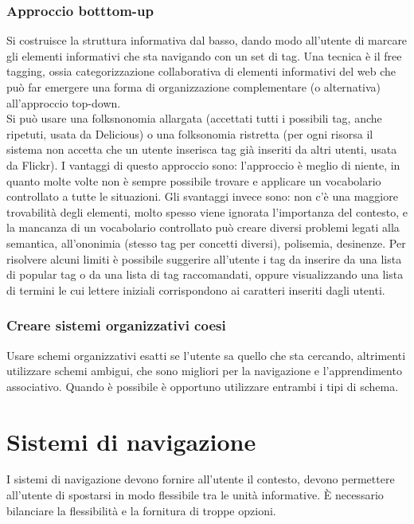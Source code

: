 \documentclass{article}
\begin{document}
\subsubsection{Approccio botttom-up}
Si costruisce la struttura informativa dal basso, dando modo all'utente di marcare gli elementi informativi che sta navigando con un set di tag. Una tecnica è il free tagging, ossia categorizzazione collaborativa di elementi informativi del web che può far emergere una forma di organizzazione complementare (o alternativa) all'approccio top-down.\\
Si può usare una folksnonomia allargata (accettati tutti i possibili tag, anche ripetuti, usata da Delicious) o una folksonomia ristretta (per ogni risorsa il sistema non accetta che un utente inserisca tag già inseriti da altri utenti, usata da Flickr).
I vantaggi di questo approccio sono: l'approccio è meglio di niente, in quanto molte volte non è sempre possibile trovare e applicare un vocabolario controllato a tutte le situazioni.
Gli svantaggi invece sono: non c'è una maggiore trovabilità degli elementi, molto spesso viene ignorata l'importanza del contesto, e la mancanza di un vocabolario controllato può creare diversi problemi legati alla semantica, all'ononimia (stesso tag per concetti diversi), polisemia, desinenze. Per risolvere alcuni limiti è possibile suggerire all'utente i tag da inserire da una lista di popular tag o da una lista di tag raccomandati, oppure visualizzando una lista di termini le cui lettere iniziali corrispondono ai caratteri inseriti dagli utenti.
\subsubsection{Creare sistemi organizzativi coesi}
Usare schemi organizzativi esatti se l'utente sa quello che sta cercando, altrimenti utilizzare schemi ambigui, che sono migliori per la navigazione e l'apprendimento associativo. Quando è possibile è opportuno utilizzare entrambi i tipi di schema.
\section{Sistemi di navigazione}
I sistemi di navigazione devono fornire all'utente il contesto, devono permettere all'utente di spostarsi in modo flessibile tra le unità informative. È necessario bilanciare la flessibilità e la fornitura di troppe opzioni.
\end{document}
